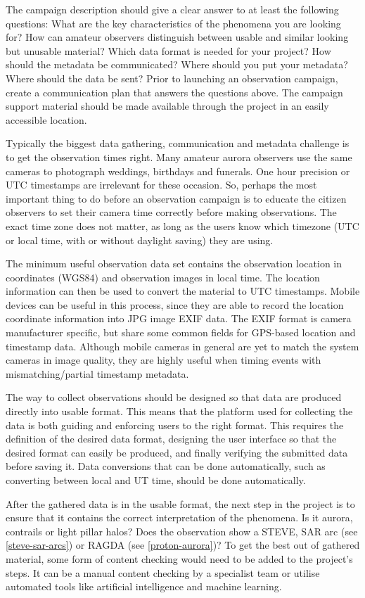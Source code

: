 \documentclass{article}
\begin{document}
The campaign description should give a clear answer to at least the following questions: What are the key characteristics of the phenomena you are looking for? How can amateur observers distinguish between usable and similar looking but unusable material? Which data format is needed for your project? How should the metadata be communicated? Where should you put your metadata? Where should the data be sent? Prior to launching an observation campaign, create a communication plan that answers the questions above. The campaign support material should be made available through the project in an easily accessible location.

Typically the biggest data gathering, communication and metadata challenge is to get the observation times right. Many amateur aurora observers use the same cameras to photograph weddings, birthdays and funerals. One hour precision or UTC timestamps are irrelevant for these occasion. So, perhaps the most important thing to do before an observation campaign is to educate the citizen observers to set their camera time correctly before making observations. The exact time zone does not matter, as long as the users know which timezone (UTC or local time, with or without daylight saving) they are using.

The minimum useful observation data set contains the observation location in coordinates (WGS84) and observation images in local time. The location information can then be used to convert the material to UTC timestamps. 
Mobile devices can be useful in this process, since they are able to record the location coordinate information into JPG image EXIF data. The EXIF format is camera manufacturer specific, but share some common fields for GPS-based location and timestamp data. Although mobile cameras in general are yet to match the system cameras in image quality, they are highly useful when timing events with mismatching/partial timestamp metadata.

The way to collect observations should be designed so that data are produced directly into usable format. This means that the platform used for collecting the data is both guiding and enforcing users to the right format. This requires the definition of the desired data format, designing the user interface so that the desired format can easily be produced, and finally verifying the submitted data before saving it. Data conversions that can be done automatically, such as converting between local and UT time, should be done automatically.

After the gathered data is in the usable format, the next step in the project is to ensure that it contains the correct interpretation of the phenomena. Is it aurora, contrails or light pillar halos? Does the observation show a STEVE, SAR arc (see \ref{steve-sar-arcs}) or RAGDA (see \ref{proton-aurora})? To get the best out of gathered material, some form of content checking would need to be added to the project's steps. It can be a manual content checking by a specialist team or utilise automated tools like artificial intelligence and machine learning.
\end{document}
